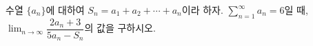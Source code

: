 수열 $\{a_n\}$에 대하여 $S_n=a_1+a_2+\cdots+a_n$이라 하자. $\displaystyle\sum_{n=1}^{\infty} a_n=6$일 때, $\displaystyle\lim_{n\to\infty}\dfrac{2a_n+3}{5a_n-S_n}$의 값을 구하시오.
